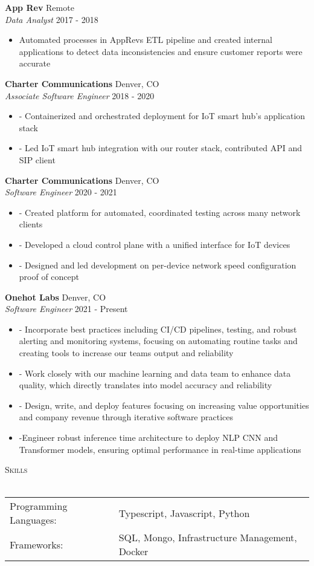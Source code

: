 \documentclass[a4paper]{article}
\newcommand{\lineunder} {
    \vspace*{-8pt} \\
    \hspace*{-18pt} \hrulefill \\
}
\newcommand{\header} [1] {
    {\hspace*{-18pt}\vspace*{6pt} \textsc{#1}}
    \vspace*{-6pt} \lineunder
}
\begin{document}
\textbf{App Rev} \hfill Remote\\
\textit{Data Analyst} \hfill 2017 - 2018\\
\vspace{-1mm}
\begin{itemize} \itemsep 1pt
	\item Automated processes in AppRev\textquotesingle{}s ETL pipeline and created internal applications to detect data inconsistencies and ensure customer reports were accurate
\end{itemize}
\textbf{Charter Communications} \hfill Denver, CO\\
\textit{Associate Software Engineer} \hfill 2018 - 2020\\
\vspace{-1mm}
\begin{itemize} \itemsep 1pt
	\item - Containerized and orchestrated deployment for IoT smart hub’s application stack
	\item - Led IoT smart hub integration with our router stack, contributed API and SIP client
\end{itemize}
\textbf{Charter Communications} \hfill Denver, CO\\
\textit{Software Engineer} \hfill 2020 - 2021\\
\vspace{-1mm}
\begin{itemize} \itemsep 1pt
	\item - Created platform for automated, coordinated testing across many network clients
	\item - Developed a cloud control plane with a unified interface for IoT devices
	\item - Designed and led development on per-device network speed configuration proof of concept
\end{itemize}
\textbf{Onehot Labs} \hfill Denver, CO\\
\textit{Software Engineer} \hfill 2021 - Present\\
\vspace{-1mm}
\begin{itemize} \itemsep 1pt
	\item - Incorporate best practices including CI/CD pipelines, testing, and robust alerting and monitoring systems, focusing on automating routine tasks and creating tools to increase our team\textquotesingle{}s output and reliability
	\item - Work closely with our machine learning and data team to enhance data quality, which directly translates into model accuracy and reliability
	\item - Design, write, and deploy features focusing on increasing value opportunities and company revenue through iterative software practices
	\item -Engineer robust inference time architecture to deploy NLP CNN and Transformer models, ensuring optimal performance in real-time applications
\end{itemize}

\header{Skills}
\begin{tabular}{ l l }
	Programming Languages: & Typescript, Javascript, Python                \\
	Frameworks:            & SQL, Mongo, Infrastructure Management, Docker \\
\end{tabular}
\vspace{2mm}





\ 
\end{document}
